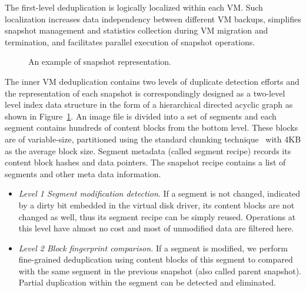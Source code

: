 The first-level deduplication is logically localized within each VM.
Such localization increases data independency between different  VM backups,
simplifies  snapshot  management and statistics collection during VM migration and termination,
and facilitates parallel execution of snapshot operations.

\begin{figure}[htbp]
  \centering
  \caption{An example of snapshot representation.}
  \label{fig:snapshot}
\end{figure}

The inner VM deduplication contains two levels of duplicate detection efforts and the representation of
each snapshot is correspondingly designed as a two-level level index data structure in the form of a hierarchical
directed acyclic graph as shown in Figure~\ref{fig:snapshot}.
An image file is divided into a set of segments and each  segment contains hundreds of content blocks from the bottom level.
These blocks are of variable-size, partitioned using
the standard chunking technique~\cite{similar94} with 4KB as the average block size. 
Segment metadata (called segment recipe) records its  content block hashes and data pointers. 
The snapshot recipe contains a list of segments and other meta data information.
\begin{itemize}
\item {\em Level 1 Segment modification  detection}.
If a segment is not changed, indicated by a dirty bit embedded in the virtual disk driver, its content blocks are not changed as well, thus its segment recipe can be simply reused. Operations at this level have almost no cost and most of unmodified data are filtered here. 

\item {\em Level 2  Block fingerprint comparison.}
If a segment is modified, we perform fine-grained deduplication using content blocks of this segment to compared with 
the same segment in
the previous snapshot (also called parent snapshot). Partial duplication
within the segment can be detected and eliminated. 
\end{itemize}

